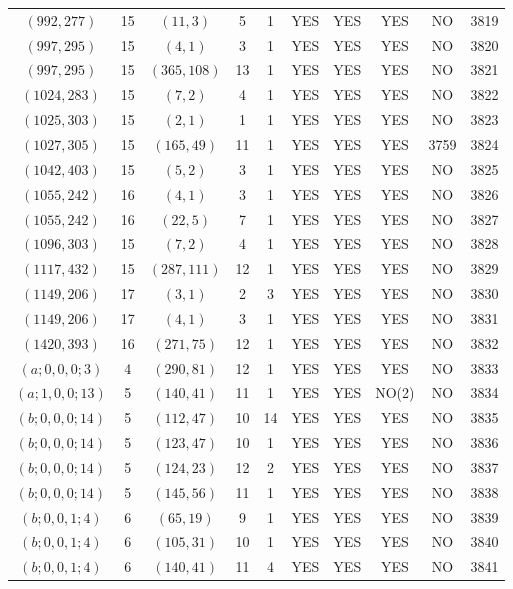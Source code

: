 \begin{longtable}{|c|c|c|c|c|c|c|c|c|c|}
$(992, 277)$ & 15 & $(11, 3)$ & 5 & 1 & YES & YES & YES & NO & 3819\\
$(997, 295)$ & 15 & $(4, 1)$ & 3 & 1 & YES & YES & YES & NO & 3820\\
$(997, 295)$ & 15 & $(365, 108)$ & 13 & 1 & YES & YES & YES & NO & 3821\\
$(1024, 283)$ & 15 & $(7, 2)$ & 4 & 1 & YES & YES & YES & NO & 3822\\
$(1025, 303)$ & 15 & $(2, 1)$ & 1 & 1 & YES & YES & YES & NO & 3823\\
$(1027, 305)$ & 15 & $(165, 49)$ & 11 & 1 & YES & YES & YES & 3759 & 3824\\
$(1042, 403)$ & 15 & $(5, 2)$ & 3 & 1 & YES & YES & YES & NO & 3825\\
$(1055, 242)$ & 16 & $(4, 1)$ & 3 & 1 & YES & YES & YES & NO & 3826\\
$(1055, 242)$ & 16 & $(22, 5)$ & 7 & 1 & YES & YES & YES & NO & 3827\\
$(1096, 303)$ & 15 & $(7, 2)$ & 4 & 1 & YES & YES & YES & NO & 3828\\
$(1117, 432)$ & 15 & $(287, 111)$ & 12 & 1 & YES & YES & YES & NO & 3829\\
$(1149, 206)$ & 17 & $(3, 1)$ & 2 & 3 & YES & YES & YES & NO & 3830\\
$(1149, 206)$ & 17 & $(4, 1)$ & 3 & 1 & YES & YES & YES & NO & 3831\\
$(1420, 393)$ & 16 & $(271, 75)$ & 12 & 1 & YES & YES & YES & NO & 3832\\
$(a; 0, 0, 0; 3)$ & 4 & $(290, 81)$ & 12 & 1 & YES & YES & YES & NO & 3833\\
$(a; 1, 0, 0; 13)$ & 5 & $(140, 41)$ & 11 & 1 & YES & YES & NO(2) & NO & 3834\\
$(b; 0, 0, 0; 14)$ & 5 & $(112, 47)$ & 10 & 14 & YES & YES & YES & NO & 3835\\
$(b; 0, 0, 0; 14)$ & 5 & $(123, 47)$ & 10 & 1 & YES & YES & YES & NO & 3836\\
$(b; 0, 0, 0; 14)$ & 5 & $(124, 23)$ & 12 & 2 & YES & YES & YES & NO & 3837\\
$(b; 0, 0, 0; 14)$ & 5 & $(145, 56)$ & 11 & 1 & YES & YES & YES & NO & 3838\\
$(b; 0, 0, 1; 4)$ & 6 & $(65, 19)$ & 9 & 1 & YES & YES & YES & NO & 3839\\
$(b; 0, 0, 1; 4)$ & 6 & $(105, 31)$ & 10 & 1 & YES & YES & YES & NO & 3840\\
$(b; 0, 0, 1; 4)$ & 6 & $(140, 41)$ & 11 & 4 & YES & YES & YES & NO & 3841\\

\end{longtable}
